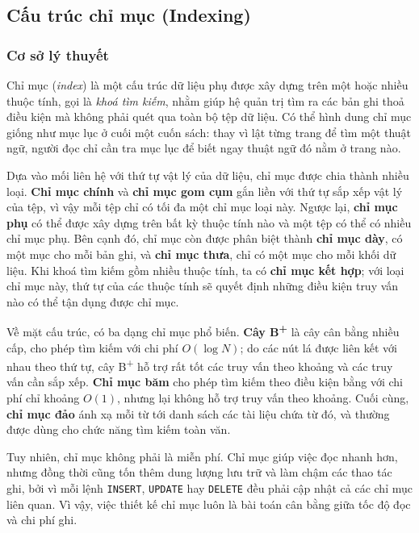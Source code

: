 \subsection{Cấu trúc chỉ mục (Indexing)}
\label{subsec:indexing}
\subsubsection{Cơ sở lý thuyết}
\label{subsubsec:indexing-theory}

Chỉ mục (\emph{index}) là một cấu trúc dữ liệu phụ được xây dựng trên một hoặc nhiều thuộc tính, gọi là \emph{khoá tìm kiếm}, nhằm giúp hệ quản trị tìm ra các bản ghi thoả điều kiện mà không phải quét qua toàn bộ tệp dữ liệu. Có thể hình dung chỉ mục giống như mục lục ở cuối một cuốn sách: thay vì lật từng trang để tìm một thuật ngữ, người đọc chỉ cần tra mục lục để biết ngay thuật ngữ đó nằm ở trang nào.

Dựa vào mối liên hệ với thứ tự vật lý của dữ liệu, chỉ mục được chia thành nhiều loại. \textbf{Chỉ mục chính} và \textbf{chỉ mục gom cụm} gắn liền với thứ tự sắp xếp vật lý của tệp, vì vậy mỗi tệp chỉ có tối đa một chỉ mục loại này. Ngược lại, \textbf{chỉ mục phụ} có thể được xây dựng trên bất kỳ thuộc tính nào và một tệp có thể có nhiều chỉ mục phụ. Bên cạnh đó, chỉ mục còn được phân biệt thành \textbf{chỉ mục dày}, có một mục cho mỗi bản ghi, và \textbf{chỉ mục thưa}, chỉ có một mục cho mỗi khối dữ liệu. Khi khoá tìm kiếm gồm nhiều thuộc tính, ta có \textbf{chỉ mục kết hợp}; với loại chỉ mục này, thứ tự của các thuộc tính sẽ quyết định những điều kiện truy vấn nào có thể tận dụng được chỉ mục.

Về mặt cấu trúc, có ba dạng chỉ mục phổ biến. \textbf{Cây B\textsuperscript{+}} là cây cân bằng nhiều cấp, cho phép tìm kiếm với chi phí $O(\log N)$; do các nút lá được liên kết với nhau theo thứ tự, cây B\textsuperscript{+} hỗ trợ rất tốt các truy vấn theo khoảng và các truy vấn cần sắp xếp. \textbf{Chỉ mục băm} cho phép tìm kiếm theo điều kiện bằng với chi phí chỉ khoảng $O(1)$, nhưng lại không hỗ trợ truy vấn theo khoảng. Cuối cùng, \textbf{chỉ mục đảo} ánh xạ mỗi từ tới danh sách các tài liệu chứa từ đó, và thường được dùng cho chức năng tìm kiếm toàn văn.

Tuy nhiên, chỉ mục không phải là miễn phí. Chỉ mục giúp việc đọc nhanh hơn, nhưng đồng thời cũng tốn thêm dung lượng lưu trữ và làm chậm các thao tác ghi, bởi vì mỗi lệnh \texttt{INSERT}, \texttt{UPDATE} hay \texttt{DELETE} đều phải cập nhật cả các chỉ mục liên quan. Vì vậy, việc thiết kế chỉ mục luôn là bài toán cân bằng giữa tốc độ đọc và chi phí ghi.

